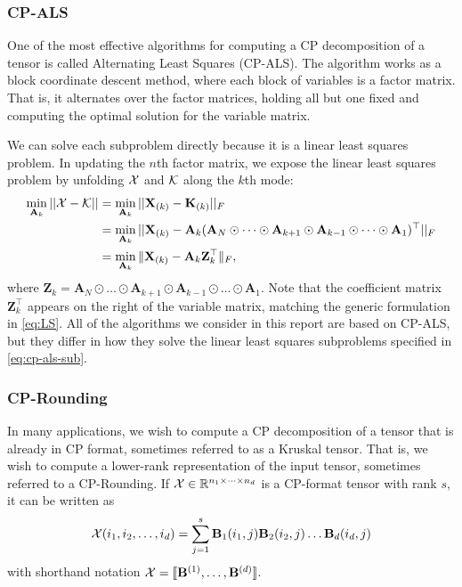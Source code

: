 \documentclass{article}
\newcommand{\mat}[1]{\mathbf{#1}}
\newcommand{\T}[2][]{#1{\mathbf{\cal{#2}}}} 						%
\begin{document}
\subsubsection{CP-ALS}

One of the most effective algorithms for computing a CP decomposition of a tensor is called Alternating Least Squares (CP-ALS).
The algorithm works as a block coordinate descent method, where each block of variables is a factor matrix.
That is, it alternates over the factor matrices, holding all but one fixed and computing the optimal solution for the variable matrix.

We can solve each subproblem directly because it is a linear least squares problem.
In updating the $n$th factor matrix, we expose the linear least squares problem by unfolding $\T{X}$ and $\T{K}$ along the $k$th mode:
\begin{align}
\label{eq:cp-als-sub}
\min_{\mat{A}_k}||\T{X} - \T{K}|| &= \min_{\mat{A}_k}||\mat{X}_{(k)} - \mat{K}_{(k)}||_F \notag \\ 
&=  \min_{\mat{A}_k}||\mat{X}_{(k)} - \mat{A}_k(\mat{A}_N \odot \dots \odot \mat{A}_{k+1} \odot \mat{A}_{k-1} \odot \dots \odot \mat{A}_1)^\top||_F \notag \\ 
&=  \min_{\mat{A}_k}\|\mat{X}_{(k)}-\mat{A}_k\mat{Z}_k^\top\|_F,
\end{align}
where $\mat{Z}_k=\mat{A}_N \odot \dots \odot \mat{A}_{k+1} \odot \mat{A}_{k-1} \odot \dots \odot \mat{A}_1$.
Note that the coefficient matrix $\mat{Z}_k^\top$ appears on the right of the variable matrix, matching the generic formulation in \cref{eq:LS}.
All of the algorithms we consider in this report are based on CP-ALS, but they differ in how they solve the linear least squares subproblems specified in \cref{eq:cp-als-sub}.

\subsubsection{CP-Rounding}
\label{sec:cp-rounding}

In many applications, we wish to compute a CP decomposition of a tensor that is already in CP format, sometimes referred to as a Kruskal tensor.
That is, we wish to compute a lower-rank representation of the input tensor, sometimes referred to a CP-Rounding.
If $\T{X} \in \mathbb{R}^{n_1 \times \dots \times n_d}$ is a CP-format tensor with rank $s$, it can be written as 
$$\T{X}(i_1,i_2,\dots, i_d) = \sum^{s}_{j=1} \mat{B}_1(i_1,j)\mat{B}_2(i_2,j) \dots \mat{B}_d(i_d,j)$$
with shorthand notation $\T{X} = [\![\mat{B}^{(1)}, \dots ,\mat{B}^{(d)}]\!]$.
\end{document}
